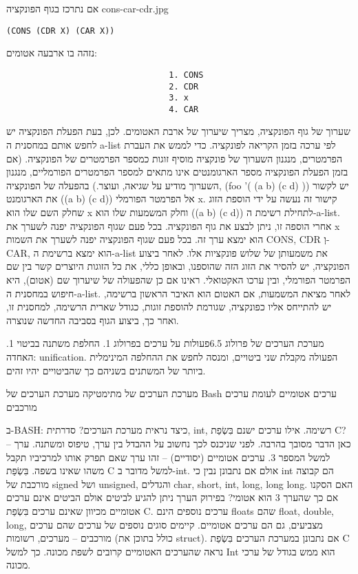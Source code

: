       אם נתרכז בגוף הפונקציה
      cons-car-cdr.jpg

\begin{verbatim}
(CONS (CDR X) (CAR X))
\end{verbatim}
      נזהה בו ארבעה אטומים:
\begin{verbatim}
                                 1. CONS
                                 2. CDR
                                 3. x
                                 4. CAR
\end{verbatim}
      שערוך של גוף הפונקציה, מצריך שיערוך של ארבת האטומים. לכן, בעת הפעלת הפונקציה יש לחפש אותם במחסנית ה a-list לפי ערכה בזמן הקריאה לפונקציה. כדי לממש את העברת הפרמטרים, מנגנון השערוך של פונקציה מוסיף זוגות כמספר הפרמטרים של הפונקציה. (אם בזמן הפעלת הפונקציה מספר הארגומנטים אינו מתאים למספר הפרמטרים הפורמליים, מנגנון השערוך מודיע על שגיאה, ועוצר.)
      בהפעלה של הפונקציה,
      (foo '( (a b) (c d) ))
      יש לקשור את הארגומנט ((a b) (c d)) אל הפרמטר הפורמלי x. קישור זה נעשה על ידי הוספת הזוג שחלק השם שלו הוא x וחלק המשמעות שלו הוא ((a b) (c d)) לתחילת רשימת ה-a-list. אחרי הוספה זו, ניתן לבצע את גוף הפונקציה. בכל פעם שגוף הפונקציה יפנה לשערך את x הוא ימצא ערך זה. בכל פעם שגוף הפונקציה יפנה לשערך את השמות CONS, CDR וְ-CAR, הוא ימצא ברשימת ה-a-list את משמעותן של שלוש פונקציות אלו. לאחר ביצוע הפונקציה, יש להסיר את הזוג הזה שהוספנו, ובאופן כללי, את כל הזוגות היוצרים קשר בין שם הפרמטר הפורמלי, ובין ערכו האקטואלי.
      ראינו אם כן שהפעולה של שיערוך שם (אטום), היא חיפוש במחסנית ה-a-list. לאחר מציאת המשמעות, אם האטום הוא האיבר הראשון ברשימה, יש להתייחס אליו כפונקציה, שגורמת להוספת זוגות, כגודל שארית הרשימה, למחסנית זו, ואחר כך, ביצוע הגוף בסביבה החדשה שנוצרה.

      מערכת הערכים של פרולוג
      6.5פעולות על ערכים בפרולוג
      1. החלפת משתנה בביטוי
      1. האחדה: unification. הפעולה מקבלת שני ביטויים, ומנסה לחפש את ההחלפה המינימלית ביותר של המשתנים בשניהם כך שהביטויים יהיו זהים.

      מערכת הערכים של מתימטיקה
      מערכת הערכים של Bash
      ערכים אטומיים לעומת ערכים מורכבים

      ב-BASH: כיצד נראית מערכת הערכים?
      סדרתית, int, רשימה.
      אילו ערכים ישנם בִּשְׂפַת C?
      כאן הדבר מסובך בהרבה. לפני שניכנס לכך נחשוב על ההבדל בין ערך, טיפוס ומשתנה.
      ערך – למשל המספר 3. ערכים אטומיים (יסודיים) – זהו ערך שאם תפרק אותו למרכיביו תקבל משהו שאינו בשפה. בִּשְׂפַת C למשל מדובר ב-int. אולם אם נתבונן נבין כי int הם קבוצה מורכבת של signed ושל unsigned, והגדלים char, short, int, long, long long.
      האם הסקנו אם כך שהערך 3 הוא אטומי? בפירוק הערך ניתן להגיע לביטים אולם הביטים אינם ערכים אטומיים מכיוון שאינם ערכים בִּשְׂפַת C.
      ערכים נוספים הינם floats שהם float, double, long, מצביעים, גם הם ערכים אטומיים.
      קיימים סוגים נוספים של ערכים שהם ערכים מורכבים – מערכים, רשומות (כולל בתוכן את struct).
      אם נתבונן במערכת הערכים בִּשְׂפַת C נראה שהערכים האטומיים קרובים לשפת מכונה. כך למשל Int הוא ממש בגודל של ערכי מכונה.

